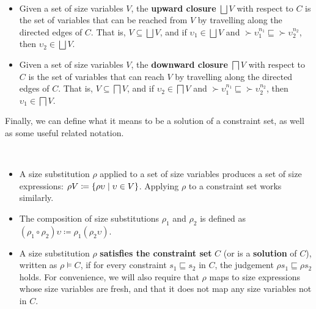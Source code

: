 \begin{definition}~\\[-4ex]
\begin{itemize}
  \item Given a set of size variables $V$, the \textbf{upward closure} $\bigsqcup V$ with respect to $C$ is the set of variables that can be reached from $V$ by travelling along the directed edges of $C$.
  That is, $V \subseteq \bigsqcup V$, and if $\upsilon_1 \in \bigsqcup V$ and $\succ{\upsilon}_1^{n_1} \sqsubseteq \succ{\upsilon}_2^{n_2}$, then $\upsilon_2 \in \bigsqcup V$.
  \item Given a set of size variables $V$, the \textbf{downward closure} $\bigsqcap V$ with respect to $C$ is the set of variables that can reach $V$ by travelling along the directed edges of $C$.
  That is, $V \subseteq \bigsqcap V$, and if $\upsilon_2 \in \bigsqcap V$ and $\succ{\upsilon}_1^{n_1} \sqsubseteq \succ{\upsilon}_2^{n_2}$, then $\upsilon_1 \in \bigsqcap V$.
\end{itemize}
\end{definition}

Finally, we can define what it means to be a solution of a constraint set,
as well as some useful related notation.

\begin{definition}~\\[-4ex]
\begin{itemize}
  \item A size substitution $\rho$ applied to a set of size variables produces a set of size expressions:
  $\rho V \coloneqq \{\rho \upsilon \mid \upsilon \in V\}$.
  Applying $\rho$ to a constraint set works similarly.

  \item The composition of size substitutions $\rho_1$ and $\rho_2$ is defined as \mbox{$(\rho_1 \circ \rho_2) \upsilon \coloneqq \rho_1(\rho_2 \upsilon)$}.

  \item A size substitution $\rho$ \textbf{satisfies the constraint set} $C$ (or is a \textbf{solution} of $C$), written as $\rho \vDash C$, if for every constraint $s_1 \sqsubseteq s_2$ in $C$, the judgement $\rho s_1 \sqsubseteq \rho s_2$ holds.
  For convenience, we will also require that $\rho$ maps to size expressions whose size variables are fresh,
  and that it does not map any size variables not in $C$.
\end{itemize}
\end{definition}

